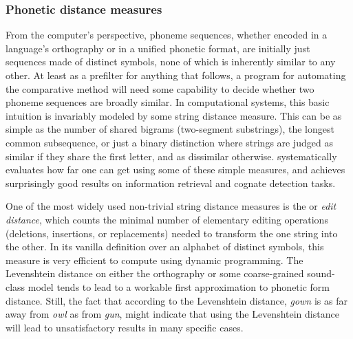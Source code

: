 \largerpage
\subsubsection{Phonetic distance measures}
From the computer's perspective, phoneme sequences, whether encoded in a language's orthography or in a unified phonetic format, are initially just sequences made of distinct symbols, none of which is inherently similar to any other. At least as a prefilter for anything that follows, a program for automating the comparative method will need some capability to decide whether two phoneme sequences are broadly similar. In computational systems, this basic intuition is invariably modeled by some string distance measure. This can be as simple as the number of shared bigrams (two-segment substrings), the longest common subsequence, or just a binary distinction where strings are judged as similar if they share the first letter, and as dissimilar otherwise. \citet{kondrak2005} systematically evaluates how far one can get using some of these simple measures, and achieves surprisingly good results on information retrieval and cognate detection tasks.

One of the most widely used non-trivial string distance measures is the \textit{} or \textit{edit distance}, which counts the minimal number of elementary editing operations (deletions, insertions, or replacements) needed to transform the one string into the other. In its vanilla definition over an alphabet of distinct symbols, this measure is very efficient to compute using dynamic programming. The Levenshtein distance on either the orthography or some coarse-grained sound-class model tends to lead to a workable first approximation to phonetic form distance. Still, the fact that according to the Levenshtein distance, \textit{gown} is as far away from \textit{owl} as from \textit{gun}, might indicate that using the Levenshtein distance will lead to unsatisfactory results in many specific cases.

